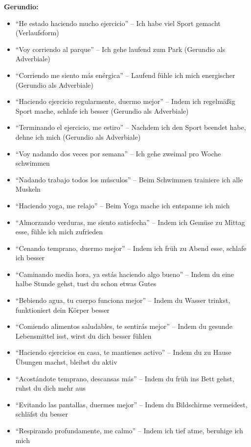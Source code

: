 \documentclass[12pt,a4paper]{article}
\begin{document}
\textbf{Gerundio:}
\begin{itemize}[leftmargin=*]
    \item \enquote{He estado haciendo mucho ejercicio} -- Ich habe viel Sport gemacht (Verlaufsform)
    \item \enquote{Voy corriendo al parque} -- Ich gehe laufend zum Park (Gerundio als Adverbiale)
    \item \enquote{Corriendo me siento más enérgica} -- Laufend fühle ich mich energischer (Gerundio als Adverbiale)
    \item \enquote{Haciendo ejercicio regularmente, duermo mejor} -- Indem ich regelmäßig Sport mache, schlafe ich besser (Gerundio als Adverbiale)
    \item \enquote{Terminando el ejercicio, me estiro} -- Nachdem ich den Sport beendet habe, dehne ich mich (Gerundio als Adverbiale)
    \item \enquote{Voy nadando dos veces por semana} -- Ich gehe zweimal pro Woche schwimmen
    \item \enquote{Nadando trabajo todos los músculos} -- Beim Schwimmen trainiere ich alle Muskeln
    \item \enquote{Haciendo yoga, me relajo} -- Beim Yoga mache ich entspanne ich mich
    \item \enquote{Almorzando verduras, me siento satisfecha} -- Indem ich Gemüse zu Mittag esse, fühle ich mich zufrieden
    \item \enquote{Cenando temprano, duermo mejor} -- Indem ich früh zu Abend esse, schlafe ich besser
    \item \enquote{Caminando media hora, ya estás haciendo algo bueno} -- Indem du eine halbe Stunde gehst, tust du schon etwas Gutes
    \item \enquote{Bebiendo agua, tu cuerpo funciona mejor} -- Indem du Wasser trinkst, funktioniert dein Körper besser
    \item \enquote{Comiendo alimentos saludables, te sentirás mejor} -- Indem du gesunde Lebensmittel isst, wirst du dich besser fühlen
    \item \enquote{Haciendo ejercicios en casa, te mantienes activo} -- Indem du zu Hause Übungen machst, bleibst du aktiv
    \item \enquote{Acostándote temprano, descansas más} -- Indem du früh ins Bett gehst, ruhst du dich mehr aus
    \item \enquote{Evitando las pantallas, duermes mejor} -- Indem du Bildschirme vermeidest, schläfst du besser
    \item \enquote{Respirando profundamente, me calmo} -- Indem ich tief atme, beruhige ich mich

\end{itemize}
\end{document}

